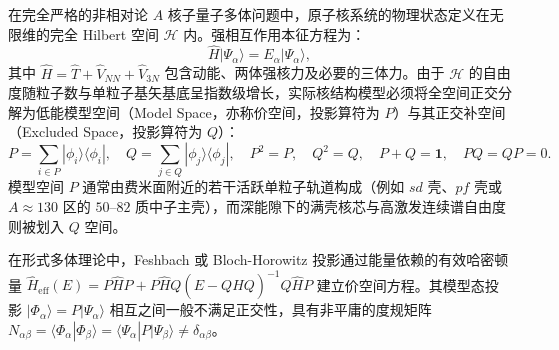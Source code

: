 在完全严格的非相对论 $A$ 核子量子多体问题中，原子核系统的物理状态定义在无限维的完全 Hilbert 空间 $\mathcal{H}$ 内。强相互作用本征方程为：
\begin{equation}\label{eq:2-7-full-schrodinger}
\hat{H} |\Psi_\alpha\rangle = E_\alpha |\Psi_\alpha\rangle,
\end{equation}
其中 $\hat{H} = \hat{T} + \hat{V}_{NN} + \hat{V}_{3N}$ 包含动能、两体强核力及必要的三体力。由于 $\mathcal{H}$ 的自由度随粒子数与单粒子基矢基底呈指数级增长，实际核结构模型必须将全空间正交分解为低能模型空间（Model Space，亦称价空间，投影算符为 $P$）与其正交补空间（Excluded Space，投影算符为 $Q$）：
\begin{equation}\label{eq:2-7-PQ-projectors}
P = \sum_{i \in P} |\phi_i\rangle \langle \phi_i|, \quad Q = \sum_{j \in Q} |\phi_j\rangle \langle \phi_j|, \quad P^2 = P, \quad Q^2 = Q, \quad P + Q = \mathbf{1}, \quad PQ = QP = 0.
\end{equation}
模型空间 $P$ 通常由费米面附近的若干活跃单粒子轨道构成（例如 $sd$ 壳、$pf$ 壳或 $A\approx 130$ 区的 $50\text{--}82$ 质中子主壳），而深能隙下的满壳核芯与高激发连续谱自由度则被划入 $Q$ 空间。

在形式多体理论中，Feshbach 或 Bloch-Horowitz 投影通过能量依赖的有效哈密顿量 $\hat{H}_{\mathrm{eff}}(E) = P\hat{H}P + P\hat{H}Q(E - Q\hat{H}Q)^{-1}Q\hat{H}P$ 建立价空间方程。其模型态投影 $|\Phi_\alpha\rangle = P|\Psi_\alpha\rangle$ 相互之间一般不满足正交性，具有非平庸的度规矩阵 $N_{\alpha\beta} = \langle \Phi_\alpha | \Phi_\beta \rangle = \langle \Psi_\alpha | P | \Psi_\beta \rangle \ne \delta_{\alpha\beta}$。

